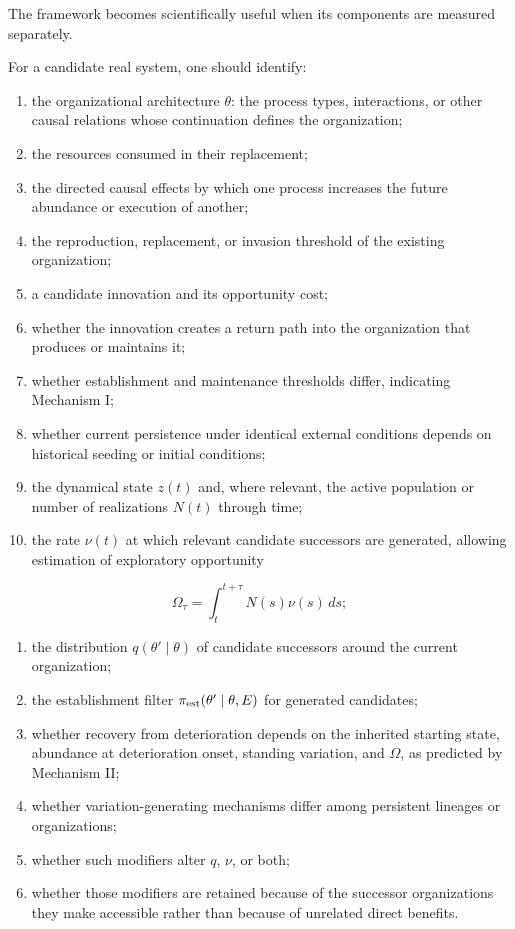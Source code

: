 \documentclass[11pt,a4paper]{article}
\begin{document}
The framework becomes scientifically useful when its components are
measured separately.

For a candidate real system, one should identify:

\begin{enumerate}
\def\labelenumi{\alph{enumi})}
\item
  the organizational architecture \(\theta\): the process types,
  interactions, or other causal relations whose continuation defines the
  organization;
\item
  the resources consumed in their replacement;
\item
  the directed causal effects by which one process increases the future
  abundance or execution of another;
\item
  the reproduction, replacement, or invasion threshold of the existing
  organization;
\item
  a candidate innovation and its opportunity cost;
\item
  whether the innovation creates a return path into the organization
  that produces or maintains it;
\item
  whether establishment and maintenance thresholds differ, indicating
  Mechanism I;
\item
  whether current persistence under identical external conditions
  depends on historical seeding or initial conditions;
\item
  the dynamical state \(z(t)\) and, where relevant, the active
  population or number of realizations \(N(t)\) through time;
\item
  the rate \(\nu(t)\) at which relevant candidate successors are
  generated, allowing estimation of exploratory opportunity
\end{enumerate}

\[
\Omega_\tau=\int_t^{t+\tau}N(s)\nu(s)\,ds;
\]

\begin{enumerate}
\def\labelenumi{\alph{enumi})}
\setcounter{enumi}{10}
\item
  the distribution \(q(\theta'\mid\theta)\) of candidate successors
  around the current organization;
\item
  the establishment filter \(\pi_{\rm est}(\theta'\mid\theta,E)\) for
  generated candidates;
\item
  whether recovery from deterioration depends on the inherited starting
  state, abundance at deterioration onset, standing variation, and
  \(\Omega\), as predicted by Mechanism II;
\item
  whether variation-generating mechanisms differ among persistent
  lineages or organizations;
\item
  whether such modifiers alter \(q\), \(\nu\), or both;
\item
  whether those modifiers are retained because of the successor
  organizations they make accessible rather than because of unrelated
  direct benefits.
\end{enumerate}
\end{document}
